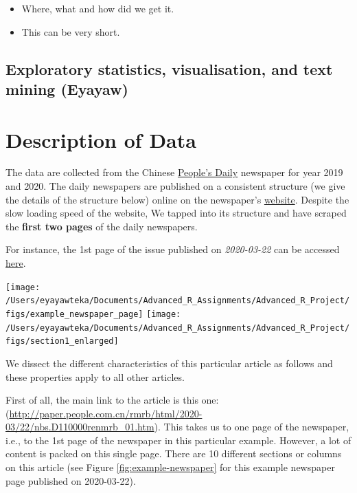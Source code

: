 \documentclass[12pt,a4paper]{article}
\let\origfigure\figure
\let\endorigfigure\endfigure
\renewenvironment{figure}[1][2] {
    \expandafter\origfigure\expandafter[H]
} {
    \endorigfigure
}
\begin{document}
\begin{itemize}
\item
  Where, what and how did we get it.
\item
  This can be very short.
\end{itemize}

\hypertarget{exploratory-statistics-visualisation-and-text-mining-eyayaw}{%
\subsection{Exploratory statistics, visualisation, and text mining (Eyayaw)}\label{exploratory-statistics-visualisation-and-text-mining-eyayaw}}

\hypertarget{description-of-data}{%
\section{Description of Data}\label{description-of-data}}

The data are collected from the Chinese \href{https://en.wikipedia.org/wiki/People\%27s_Daily}{People's Daily} newspaper for year 2019 and 2020. The daily newspapers are published on a consistent structure (we give the details of the structure below) online on the newspaper's \href{paper.people.com.cn}{website}. Despite the slow loading speed of the website, We tapped into its structure and have scraped the \textbf{first two pages} of the daily newspapers.

For instance, the 1st page of the issue published on \emph{2020-03-22} can be accessed \href{http://paper.people.com.cn/rmrb/html/2020-03/22/nbs.D110000renmrb_01.htm}{here}.

\begin{figure}

{\centering \texttt{[image: /Users/eyayawteka/Documents/Advanced\_R\_Assignments/Advanced\_R\_Project/figs/example\_newspaper\_page]} \texttt{[image: /Users/eyayawteka/Documents/Advanced\_R\_Assignments/Advanced\_R\_Project/figs/section1\_enlarged]} 

}

\caption{Example newspaper page published on 2020-03-22 (left), and Section or column 1 of it enlarged (right).}\label{fig:example-newspaper}
\end{figure}

We dissect the different characteristics of this particular article as follows and these properties apply to all other articles.

First of all, the main link to the article is this one: (\url{http://paper.people.com.cn/rmrb/html/2020-03/22/nbs.D110000renmrb_01.htm}). This takes us to one page of the newspaper, i.e., to the 1st page of the newspaper in this particular example. However, a lot of content is packed on this single page. There are 10 different sections or columns on this article (see Figure \ref{fig:example-newspaper} for this example newspaper page published on 2020-03-22).
\end{document}
